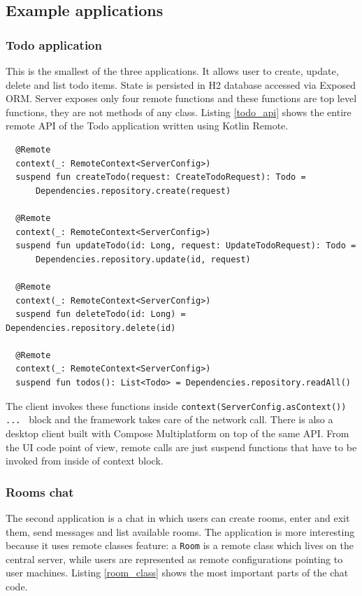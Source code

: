 \documentclass[a4paper,11pt,oneside]{article}
\newcommand{\kotlini}[1]{\texttt{#1}}
\begin{document}
\subsection{Example applications}

\subsubsection{Todo application}

This is the smallest of the three applications. It allows user to create, update, delete and list
todo items. State is persisted in H2 database accessed via Exposed ORM. Server exposes only four
remote functions and these functions are top level functions, they are not methods of any class.
Listing \ref{todo_api} shows the entire remote API of the Todo application written using Kotlin
Remote.

\begin{listing}[!h]
  \begin{verbatim}
  @Remote
  context(_: RemoteContext<ServerConfig>)
  suspend fun createTodo(request: CreateTodoRequest): Todo =
      Dependencies.repository.create(request)

  @Remote
  context(_: RemoteContext<ServerConfig>)
  suspend fun updateTodo(id: Long, request: UpdateTodoRequest): Todo =
      Dependencies.repository.update(id, request)

  @Remote
  context(_: RemoteContext<ServerConfig>)
  suspend fun deleteTodo(id: Long) = Dependencies.repository.delete(id)

  @Remote
  context(_: RemoteContext<ServerConfig>)
  suspend fun todos(): List<Todo> = Dependencies.repository.readAll()
  \end{verbatim}
  \caption{Todo application remote API in Kotlin Remote}\label{todo_api}
\end{listing}

The client invokes these functions inside \kotlini{context(ServerConfig.asContext()) { ... }} block
and the framework takes care of the network call. There is also a desktop client built with Compose
Multiplatform on top of the same API. From the UI code point of view, remote calls are just suspend
functions that have to be invoked from inside of context block.

\subsubsection{Rooms chat}

The second application is a chat in which users can create rooms, enter and exit them, send
messages and list available rooms. The application is more interesting because it uses remote
classes feature: a \kotlini{Room} is a remote class which lives on the central server, while users
are represented as remote configurations pointing to user machines. Listing \ref{room_class} shows
the most important parts of the chat code.
\end{document}
